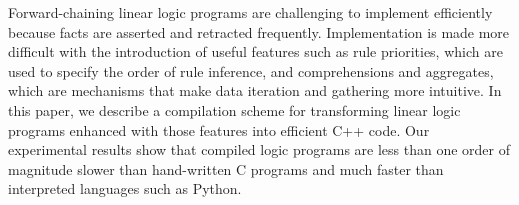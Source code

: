 Forward-chaining linear logic programs are challenging to implement efficiently
because facts are asserted and retracted frequently.  Implementation is made
more difficult with the introduction of useful features such as rule priorities,
which are used to specify the order of rule inference, and comprehensions and
aggregates, which are mechanisms that make data iteration and gathering more intuitive.  In
this paper, we describe a compilation scheme for transforming linear logic
programs enhanced with those features into efficient C++ code. Our experimental
results show that compiled logic programs are less than one order of magnitude
slower than hand-written C programs and much faster than interpreted
languages such as Python.
